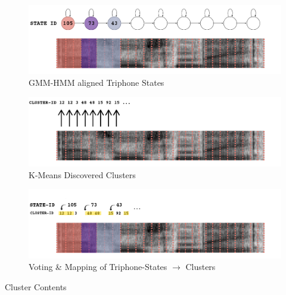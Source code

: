 \documentclass[final]{beamer} %
\begin{document}
\begin{frame}
\begin{columns}
\begin{column}{0.3\textwidth}
{                
        \begin{figure}[!htbp]
          \centering
          \minipage{\textwidth}
          \includegraphics[width=\linewidth]{figs/aligned.png}
          \caption{GMM-HMM aligned Triphone States}
          \endminipage\hfill
        \end{figure}

        \begin{figure}[!htbp]
          \centering
          \minipage{\textwidth}
          \includegraphics[width=\linewidth]{figs/clustered.png}
          \caption{K-Means Discovered Clusters}
          \endminipage\hfill
        \end{figure}
        
        
        \begin{figure}[!htbp]
          \centering
          \minipage{\textwidth}
          \includegraphics[width=\linewidth]{figs/mapped.png}
          \caption{Voting \& Mapping of Triphone-States $\rightarrow$ Clusters}
          \endminipage\hfill
        \end{figure}

        \vfill


                
        \begin{block}{\boxnumber Cluster Contents}
          

\end{block}}
\end{column}
\end{columns}
\end{frame}
\end{document}
